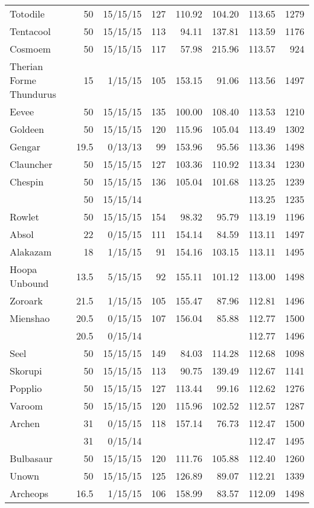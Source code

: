 \begin{longtable}{lrrrrrrr}
Totodile & 50 & 15/15/15 & 127 & 110.92 & 104.20 & 113.65 & 1279\\
Tentacool & 50 & 15/15/15 & 113 & 94.11 & 137.81 & 113.59 & 1176\\
Cosmoem & 50 & 15/15/15 & 117 & 57.98 & 215.96 & 113.57 &  924\\
Therian Forme Thundurus & 15 & 1/15/15 & 105 & 153.15 & 91.06 & 113.56 & 1497\\
Eevee & 50 & 15/15/15 & 135 & 100.00 & 108.40 & 113.53 & 1210\\
Goldeen & 50 & 15/15/15 & 120 & 115.96 & 105.04 & 113.49 & 1302\\
Gengar & 19.5 & 0/13/13 & 99 & 153.96 & 95.56 & 113.36 & 1498\\
Clauncher & 50 & 15/15/15 & 127 & 103.36 & 110.92 & 113.34 & 1230\\
Chespin & 50 & 15/15/15 & 136 & 105.04 & 101.68 & 113.25 & 1239\\
 & 50 & 15/15/14 & & & & 113.25 & 1235\\
Rowlet & 50 & 15/15/15 & 154 & 98.32 & 95.79 & 113.19 & 1196\\
Absol & 22 & 0/15/15 & 111 & 154.14 & 84.59 & 113.11 & 1497\\
Alakazam & 18 & 1/15/15 & 91 & 154.16 & 103.15 & 113.11 & 1495\\
Hoopa Unbound & 13.5 & 5/15/15 & 92 & 155.11 & 101.12 & 113.00 & 1498\\
Zoroark & 21.5 & 1/15/15 & 105 & 155.47 & 87.96 & 112.81 & 1496\\
Mienshao & 20.5 & 0/15/15 & 107 & 156.04 & 85.88 & 112.77 & 1500\\
 & 20.5 & 0/15/14 & & & & 112.77 & 1496\\
Seel & 50 & 15/15/15 & 149 & 84.03 & 114.28 & 112.68 & 1098\\
Skorupi & 50 & 15/15/15 & 113 & 90.75 & 139.49 & 112.67 & 1141\\
Popplio & 50 & 15/15/15 & 127 & 113.44 & 99.16 & 112.62 & 1276\\
Varoom & 50 & 15/15/15 & 120 & 115.96 & 102.52 & 112.57 & 1287\\
Archen & 31 & 0/15/15 & 118 & 157.14 & 76.73 & 112.47 & 1500\\
 & 31 & 0/15/14 & & & & 112.47 & 1495\\
Bulbasaur & 50 & 15/15/15 & 120 & 111.76 & 105.88 & 112.40 & 1260\\
Unown & 50 & 15/15/15 & 125 & 126.89 & 89.07 & 112.21 & 1339\\
Archeops & 16.5 & 1/15/15 & 106 & 158.99 & 83.57 & 112.09 & 1498\\

\end{longtable}
